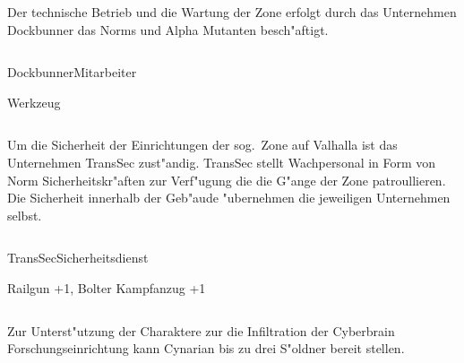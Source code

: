 
\begin{column}[l]{0.45}
    Der technische Betrieb und die Wartung der Zone erfolgt durch das Unternehmen Dockbunner das Norms und Alpha Mutanten 
    besch"aftigt.
\end{column}
\begin{column}[r]{0.45}
    \begin{nscsheet}[h]{Dockbunner\newline{}Mitarbeiter}
        \nscstats[]
        \nscruler
        \begin{nscinventory}
            \nscitem[Waffen] Werkzeug
        \end{nscinventory}
    \end{nscsheet}
\end{column}    


\begin{column}[l]{0.45}
    Um die Sicherheit der Einrichtungen der sog.~Zone auf Valhalla ist das Unternehmen TransSec zust"andig. TransSec stellt
    Wachpersonal in Form von Norm Sicherheitskr"aften zur Verf"ugung die die G"ange der Zone patroullieren. Die Sicherheit
    innerhalb der Geb"aude "ubernehmen die jeweiligen Unternehmen selbst.
\end{column}
\begin{column}[r]{0.45}
    \begin{nscsheet}[h]{TransSec\newline{}Sicherheitsdienst}
        \nscstats[ATT=2,AGG=2]
        \nscruler
        \begin{nscinventory}
            \nscitem[Waffen] Railgun +1, Bolter
            \nscitem[R"ustung] Kampfanzug +1
        \end{nscinventory}
    \end{nscsheet}
\end{column}        


Zur Unterst"utzung der Charaktere zur die Infiltration der Cyberbrain Forschungseinrichtung kann Cynarian bis zu 
drei S"oldner bereit stellen.

